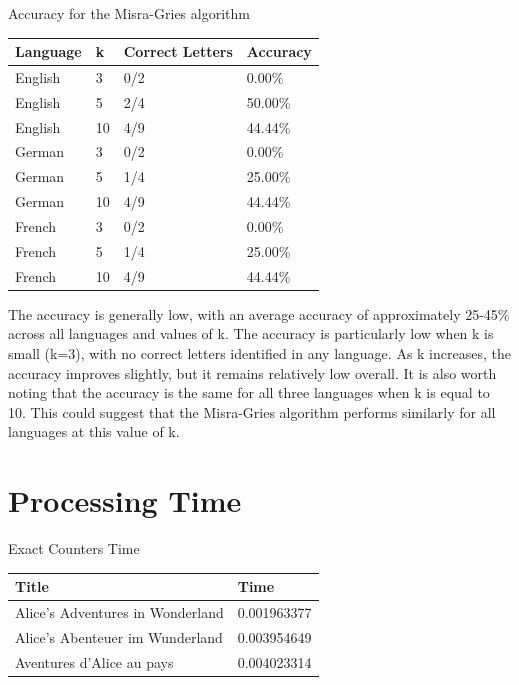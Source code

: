 \documentclass[]{revdetua}
\begin{document}
\begin{table}[!ht]
    \centering
    Accuracy for the Misra-Gries algorithm
    \begin{tabular}{|l|l|l|l|}
    \hline
        Language & k & Correct Letters & Accuracy \\ \hline
        English & 3 & 0/2 & 0.00\% \\ \hline
        English & 5 & 2/4 & 50.00\% \\ \hline
        English & 10 & 4/9 & 44.44\% \\ \hline
        German & 3 & 0/2 & 0.00\% \\ \hline
        German & 5 & 1/4 & 25.00\% \\ \hline
        German & 10 & 4/9 & 44.44\% \\ \hline
        French & 3 & 0/2 & 0.00\% \\ \hline
        French & 5 & 1/4 & 25.00\% \\ \hline
        French & 10 & 4/9 & 44.44\% \\ \hline
    \end{tabular}
\end{table}

The accuracy is generally low, with an average accuracy of approximately 25-45\% across all languages and values of k. The accuracy is particularly low when k is small (k=3), with no correct letters identified in any language. As k increases, the accuracy improves slightly, but it remains relatively low overall. It is also worth noting that the accuracy is the same for all three languages when k is equal to 10. This could suggest that the Misra-Gries algorithm performs similarly for all languages at this value of k.

\section{Processing Time}

\begin{table}[!ht]
    \centering
    Exact Counters Time
    \begin{tabular}{|l|l|}
    \hline
        Title & Time \\ \hline
        Alice’s Adventures in Wonderland & 0.001963377 \\ \hline
        Alice's Abenteuer im Wunderland & 0.003954649 \\ \hline
        Aventures d'Alice au pays & 0.004023314 \\ \hline
    \end{tabular}
\end{table}
\end{document}
